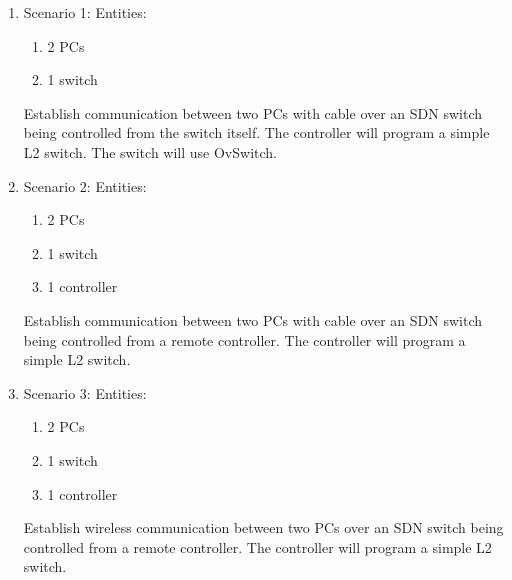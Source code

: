 \begin{enumerate}
    \item Scenario 1:  
    Entities:
    \begin{enumerate}
        \item 2 PCs
        \item 1 switch
    \end{enumerate}
    Establish communication between two PCs with cable over an SDN switch being controlled from the switch itself.
    The controller will program a simple L2 switch. 
    The switch will use OvSwitch.
    \item Scenario 2: 
    Entities:
    \begin{enumerate}
        \item 2 PCs
        \item 1 switch
        \item 1 controller
    \end{enumerate}
    Establish communication between two PCs with cable over an SDN switch being controlled from a remote controller.
    The controller will program a simple L2 switch. 
    \item Scenario 3:  
    Entities:
    \begin{enumerate}
        \item 2 PCs
        \item 1 switch
        \item 1 controller
    \end{enumerate}
    Establish wireless communication between two PCs over an SDN switch being controlled from a remote controller.
    The controller will program a simple L2 switch. 
\end{enumerate}



